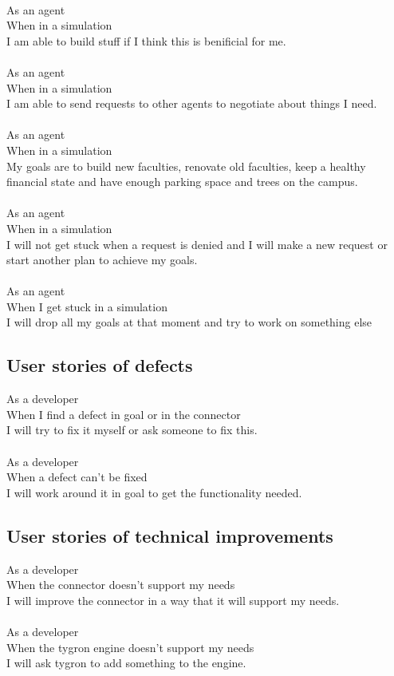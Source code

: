\\
As an agent\\
When in a simulation\\
I am able to build stuff if I think this is benificial for me.\\
\\
As an agent\\
When in a simulation\\
I am able to send requests to other agents to negotiate about things I need.\\
\\
As an agent\\
When in a simulation\\
My goals are to build new faculties, renovate old faculties, keep a healthy financial state and have enough parking space and trees on the campus.\\
\\
As an agent\\
When in a simulation\\
I will not get stuck when a request is denied and I will make a new request or start another plan to achieve my goals.\\
\\
As an agent\\
When I get stuck in a simulation\\
I will drop all my goals at that moment and try to work on something else

\subsection{User stories of defects}
As a developer\\
When I find a defect in goal or in the connector\\
I will try to fix it myself or ask someone to fix this.\\
\\
As a developer\\
When a defect can't be fixed\\
I will work around it in goal to get the functionality needed.

\subsection{User stories of technical improvements}
As a developer\\
When the connector doesn't support my needs\\
I will improve the connector in a way that it will support my needs.\\
\\
As a developer\\
When the tygron engine doesn't support my needs\\
I will ask tygron to add something to the engine.\\


